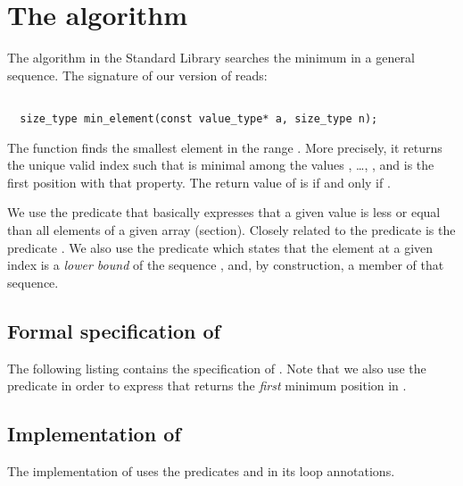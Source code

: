 
\section{The \minelement algorithm}

The \minelement  algorithm in the \cxx Standard Library \cite[\S 28.7.8]{cxx-17-draft}
searches the minimum in a general sequence. 
The signature of our version of \minelement reads:

\begin{lstlisting}[style = acsl-block]

  size_type min_element(const value_type* a, size_type n);
\end{lstlisting}

The function \minelement finds the smallest element in the range .
More precisely, it returns the unique valid index  such that
 is minimal among the values , \ldots,
, and  is the first position with that property.
The return value of \minelement is  if and only if .

We use the predicate  that
basically expresses that a given value is less or equal than all
elements of a given array (section).
%
Closely related to the predicate \LowerBound is the predicate .
%
We also use the predicate  which states that the element
at a given index  is a \emph{lower bound} of the sequence ,
and, by construction, a member of that sequence.


\subsection{Formal specification of \minelement}


The following listing contains the specification of .
Note that we also use the predicate  in order to
express that \minelement returns the \emph{first} minimum position in .



\clearpage

\subsection{Implementation of \minelement}

The implementation of  uses the predicates 
and  in its loop annotations.



\clearpage

